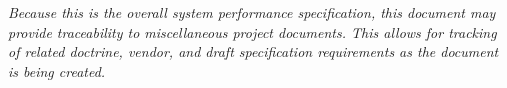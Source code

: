 % 

% 

% 

% 

% 

% 

{\em 
Because this is the overall system performance specification, this document may provide traceability to miscellaneous project documents.
This allows for tracking of related doctrine, vendor, and draft specification requirements as the document is being created.
}



